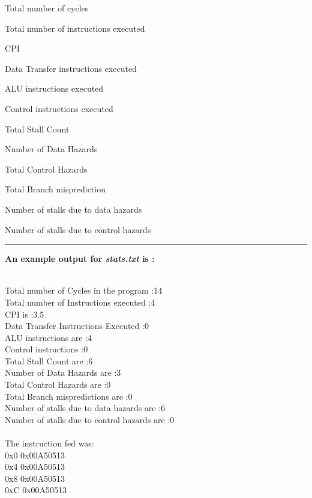 \documentclass{article}
\begin{document}
\begin{enumerate}
\begin{LARGE}
\item \textsf{Total number of cycles}
\item \textsf{Total number of instructions executed}
\item \textsf{CPI}
\item \textsf{Data Transfer instructions executed}
\item \textsf{ALU instructions executed}
\item \textsf{Control instructions executed}
\item \textsf{Total Stall Count}
\item \textsf{Number of Data Hazards}
\item \textsf{Total Control Hazards}
\item \textsf{Total Branch misprediction}
\item \textsf{Number of stalls due to data hazards}
\item \textsf{Number of stalls due to control hazards}
\end{LARGE}
\end{enumerate}

\par\noindent\rule{\textwidth}{0.4pt}



\noindent
\textbf{An example output for \textsl{stats.txt} is :}\\
\\
\begin{LARGE}
\textsf{Total number of Cycles in the program :14}\\
\textsf{Total number of Instructions executed :4}\\
\textsf{CPI is :3.5}\\
\textsf{Data Transfer Instructions Executed :0}\\
\textsf{ALU instructions are :4}\\
\textsf{Control instructions :0}\\
\textsf{Total Stall Count are :6}\\
\textsf{Number of Data Hazards are :3}\\
\textsf{Total Control Hazards are :0}\\
\textsf{Total Branch mispredictions are :0}\\
\textsf{Number of stalls due to data hazards are :6}\\
\textsf{Number of stalls due to control hazards are :0}\\\\
\textsf{The instruction fed was:}\\
\textsf{0x0	0x00A50513}\\
\textsf{0x4	0x00A50513}\\
\textsf{0x8	0x00A50513}\\
\textsf{0xC	0x00A50513}\\
\end{LARGE}
\vspace{0.6cm}
\end{document}
